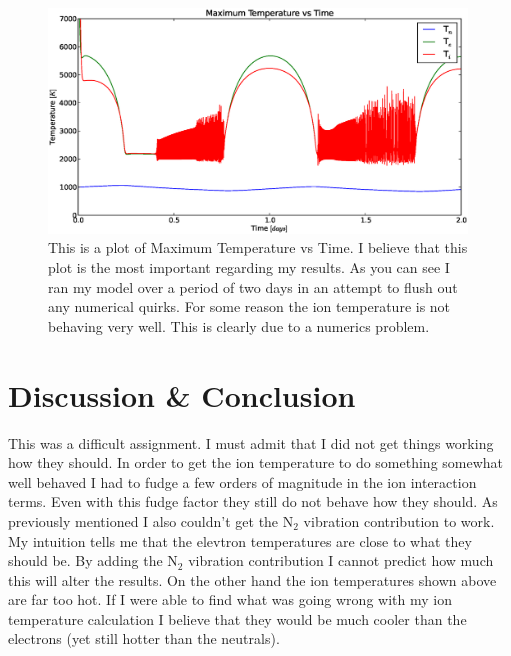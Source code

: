 \documentclass[10pt]{article}
\begin{document}
\begin{figure}[H]
	\centering
		\includegraphics[width=0.99\textwidth]{../Figures/B/T_max_vs_time.eps}
	\caption{This is a plot of Maximum Temperature vs Time. I believe that this plot is the most important regarding my results. As you can see I ran my model over a period of two days in an attempt to flush out any numerical quirks. For some reason the ion temperature is not behaving very well. This is clearly due to a numerics problem.}
	\label{fig:n3}
\end{figure}

\section{Discussion \& Conclusion}
This was a difficult assignment. I must admit that I did not get things working how they should. In order to get the ion temperature to do something somewhat well behaved I had to fudge a few orders of magnitude in the ion interaction terms. Even with this fudge factor they still do not behave how they should. As previously mentioned I also couldn't get the N$_{2}$ vibration contribution to work. My intuition tells me that the elevtron temperatures are close to what they should be. By adding the N$_{2}$ vibration contribution I cannot predict how much this will alter the results. On the other hand the ion temperatures shown above are far too hot. If I were able to find what was going wrong with my ion temperature calculation I believe that they would be much cooler than the electrons (yet still hotter than the neutrals).
\end{document}
